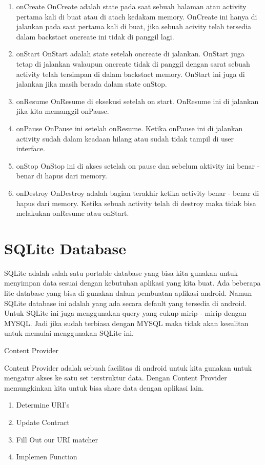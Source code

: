 \begin{enumerate}
	\item onCreate OnCreate adalah state pada saat sebuah halaman atau activity pertama kali di buat atau di atach kedakam memory. OnCreate ini hanya di jalankan pada saat pertama kali di buat, jika sebuah acivity telah tersedia dalam backstact oncreate ini tidak di panggil lagi.
	\item onStart OnStart adalah state setelah oncreate di jalankan. OnStart juga tetap di jalankan walaupun oncreate tidak di panggil dengan sarat sebuah activity telah tersimpan di dalam backstact memory. OnStart ini juga di jalankan jika masih berada dalam state onStop.
	\item onResume OnResume di eksekusi setelah on start. OnResume ini di jalankan jika kita memanggil onPause.
	\item onPause OnPause ini setelah onResume. Ketika onPause ini di jalankan activity sudah dalam keadaan hilang atau sudah tidak tampil di user interface.
	\item onStop OnStop ini di akses setelah on pause dan sebelum aktivity ini benar - benar di hapus dari memory.
	\item onDestroy OnDestroy adalah bagian terakhir ketika activity benar - benar di hapus dari memory. Ketika sebuah activity telah di destroy maka tidak bisa melakukan onResume atau onStart.
\end{enumerate}
   

\section{SQLite Database}
\vspace{12pt}
\noindent 
SQLite adalah salah satu portable database yang bisa kita gunakan untuk menyimpan data sesuai dengan kebutuhan aplikasi yang kita buat. Ada beberapa lite database yang bisa di gunakan dalam pembuatan aplikasi android. Namun SQLite database ini adalah yang ada secara default yang tersedia di android. Untuk SQLite ini juga menggunakan query yang cukup mirip - mirip dengan MYSQL. Jadi jika sudah terbiasa dengan MYSQL maka tidak akan kesulitan untuk memulai menggunakan SQLite ini. \par
\vspace{12pt}
\noindent 
Content Provider \par
\vspace{12pt}
\noindent 
Content Provider adalah sebuah facilitas di android untuk kita gunakan untuk mengatur akses ke satu set terstruktur data. Dengan Content Provider memungkinkan kita untuk bisa share data dengan aplikasi lain. \par
\begin{enumerate}
	\item Determine URI's
	\item Update Contract
	\item Fill Out our URI matcher
	\item Implemen Function
\end{enumerate}


